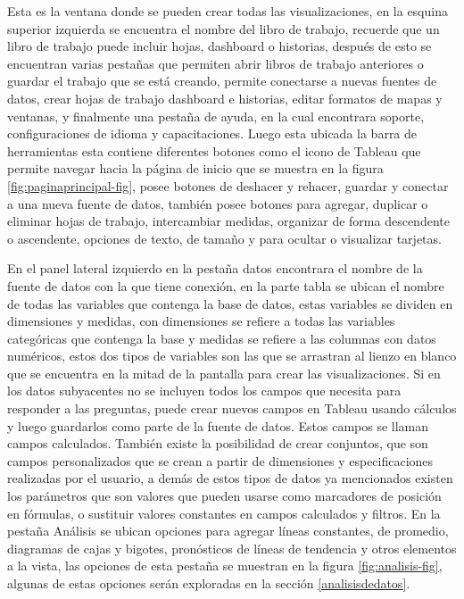 \documentclass[
]{book}
\begin{document}
Esta es la ventana donde se pueden crear todas las visualizaciones, en la esquina superior izquierda se encuentra el nombre del libro de trabajo, recuerde que un libro de trabajo puede incluir hojas, dashboard o historias, después de esto se encuentran varias pestañas que permiten abrir libros de trabajo anteriores o guardar el trabajo que se está creando, permite conectarse a nuevas fuentes de datos, crear hojas de trabajo dashboard e historias, editar formatos de mapas y ventanas, y finalmente una pestaña de ayuda, en la cual encontrara soporte, configuraciones de idioma y capacitaciones.
Luego esta ubicada la barra de herramientas esta contiene diferentes botones como el icono de Tableau que permite navegar hacia la página de inicio que se muestra en la figura \ref{fig:paginaprincipal-fig}, posee botones de deshacer y rehacer, guardar y conectar a una nueva fuente de datos, también posee botones para agregar, duplicar o eliminar hojas de trabajo, intercambiar medidas, organizar de forma descendente o ascendente, opciones de texto, de tamaño y para ocultar o visualizar tarjetas.

En el panel lateral izquierdo en la pestaña datos encontrara el nombre de la fuente de datos con la que tiene conexión, en la parte tabla se ubican el nombre de todas las variables que contenga la base de datos, estas variables se dividen en dimensiones y medidas, con dimensiones se refiere a todas las variables categóricas que contenga la base y medidas se refiere a las columnas con datos numéricos, estos dos tipos de variables son las que se arrastran al lienzo en blanco que se encuentra en la mitad de la pantalla para crear las visualizaciones. Si en los datos subyacentes no se incluyen todos los campos que necesita para responder a las preguntas, puede crear nuevos campos en Tableau usando cálculos y luego guardarlos como parte de la fuente de datos. Estos campos se llaman campos calculados. También existe la posibilidad de crear conjuntos, que son campos personalizados que se crean a partir de dimensiones y especificaciones realizadas por el usuario, a demás de estos tipos de datos ya mencionados existen los parámetros que son valores que pueden usarse como marcadores de posición en fórmulas, o sustituir valores constantes en campos calculados y filtros. En la pestaña Análisis se ubican opciones para agregar líneas constantes, de promedio, diagramas de cajas y bigotes, pronósticos de líneas de tendencia y otros elementos a la vista, las opciones de esta pestaña se muestran en la figura \ref{fig:analisis-fig}, algunas de estas opciones serán exploradas en la sección \ref{analisisdedatos}.
\end{document}
